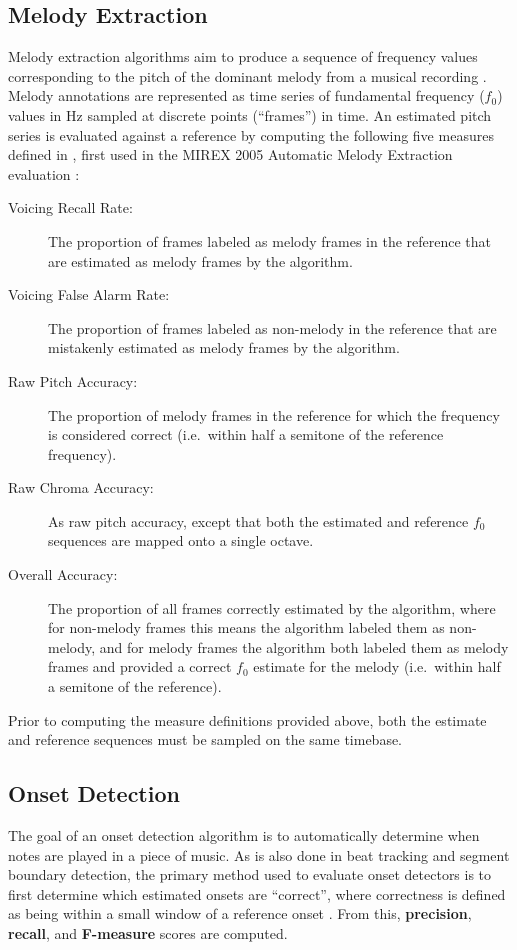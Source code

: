 \documentclass{article}
\begin{document}
\subsection{Melody Extraction}
Melody extraction algorithms aim to produce a sequence of frequency values corresponding to the pitch of the dominant melody from a musical recording \cite{salamon:MelodyReview:IEEESPM13}.
Melody annotations are represented as time series of fundamental frequency ($f_0$) values in Hz sampled at discrete points (``frames'') in time.
An estimated pitch series is evaluated against a reference by computing the following five measures defined in \cite{salamon:MelodyReview:IEEESPM13}, first used in the MIREX 2005 Automatic Melody Extraction evaluation \cite{polinerMelodyEval}:
\begin{description}
  \item[Voicing Recall Rate:] The proportion of frames labeled as melody frames in the reference that are estimated as melody frames by the algorithm.
  \item[Voicing False Alarm Rate:] The proportion of frames labeled as non-melody in the reference that are mistakenly estimated as melody frames by the algorithm.
  \item[Raw Pitch Accuracy:] The proportion of melody frames in the reference for which the frequency is considered correct (i.e.~within half a semitone of the reference frequency).
  \item[Raw Chroma Accuracy:] As raw pitch accuracy, except that both the estimated and reference $f_0$ sequences are mapped onto a single octave.
  \item[Overall Accuracy:] The proportion of all frames correctly estimated by the algorithm, where for non-melody frames this means the algorithm labeled them as non-melody, and for melody frames the algorithm both labeled them as melody frames and provided a correct $f_0$ estimate for the melody (i.e.~within half a semitone of the reference).
\end{description}
Prior to computing the measure definitions provided above, both the estimate and reference sequences must be sampled on the same timebase.

\subsection{Onset Detection}

The goal of an onset detection algorithm is to automatically determine when notes are played in a piece of music.
As is also done in beat tracking and segment boundary detection, the primary method used to evaluate onset detectors is to first determine which estimated onsets are ``correct'', where correctness is defined as being within a small window of a reference onset \cite{bock2012evaluating}.
From this, \textbf{precision}, \textbf{recall}, and \textbf{F-measure} scores are computed.
\end{document}
